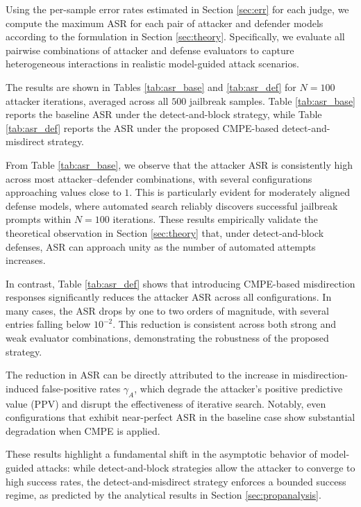 \documentclass[conference,compsoc]{IEEEtran}
\begin{document}
Using the per-sample error rates estimated in Section \ref{sec:err} for each judge, we compute the maximum ASR for each pair of attacker and defender models according to the formulation in Section \ref{sec:theory}. Specifically, we evaluate all pairwise combinations of attacker and defense evaluators to capture heterogeneous interactions in realistic model-guided attack scenarios.

The results are shown in Tables \ref{tab:asr_base} and \ref{tab:asr_def} for $N=100$ attacker iterations, averaged across all $500$ jailbreak samples. Table \ref{tab:asr_base} reports the baseline ASR under the detect-and-block strategy, while Table \ref{tab:asr_def} reports the ASR under the proposed CMPE-based detect-and-misdirect strategy.

From Table \ref{tab:asr_base}, we observe that the attacker ASR is consistently high across most attacker–defender combinations, with several configurations approaching values close to $1$. This is particularly evident for moderately aligned defense models, where automated search reliably discovers successful jailbreak prompts within $N=100$ iterations. These results empirically validate the theoretical observation in Section \ref{sec:theory} that, under detect-and-block defenses, ASR can approach unity as the number of automated attempts increases.

In contrast, Table \ref{tab:asr_def} shows that introducing CMPE-based misdirection responses significantly reduces the attacker ASR across all configurations. In many cases, the ASR drops by one to two orders of magnitude, with several entries falling below $10^{-2}$. This reduction is consistent across both strong and weak evaluator combinations, demonstrating the robustness of the proposed strategy.

The reduction in ASR can be directly attributed to the increase in misdirection-induced false-positive rates $\gamma_A$, which degrade the attacker's positive predictive value (PPV) and disrupt the effectiveness of iterative search. Notably, even configurations that exhibit near-perfect ASR in the baseline case show substantial degradation when CMPE is applied.

These results highlight a fundamental shift in the asymptotic behavior of model-guided attacks: while detect-and-block strategies allow the attacker to converge to high success rates, the detect-and-misdirect strategy enforces a bounded success regime, as predicted by the analytical results in Section \ref{sec:propanalysis}.
\end{document}
